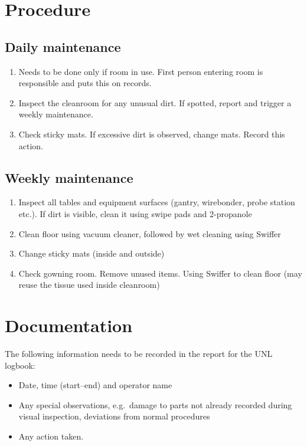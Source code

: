 \documentclass[12pt]{unlsilabsop}
\begin{document}

\section{Procedure}

\subsection{Daily maintenance}
\begin{enumerate}
    \item Needs to be done only if room in use. First person entering room is responsible and puts this on records.
    \item Inspect the cleanroom for any unusual dirt. If spotted, report and trigger a weekly maintenance.
    \item Check sticky mats. If excessive dirt is observed, change mats. Record this action.
\end{enumerate}

\subsection{Weekly maintenance}
\begin{enumerate}
    \item Inspect all tables and equipment surfaces (gantry, wirebonder, probe station etc.). If dirt is visible, clean it using swipe pads and 2-propanole
    \item Clean floor using vacuum cleaner, followed by wet cleaning using Swiffer
    \item Change sticky mats (inside and outside)
    \item Check gowning room. Remove unused items. Using Swiffer to clean floor (may reuse the tissue used inside cleanroom)
\end{enumerate}

\section{Documentation}
The following information needs to be recorded in the report for the UNL logbook:
\begin{itemize}
    \item Date, time (start--end) and operator name
    \item Any special observations, e.g.~damage to parts not already recorded during visual inspection, deviations from normal procedures
    \item Any action taken.
\end{itemize}
\end{document}
